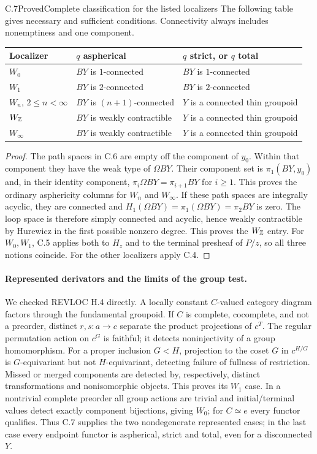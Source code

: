 \begin{claim}{C.7}{Proved}{Complete classification for the listed localizers}
\label{C:classification}
The following table gives necessary and sufficient conditions.
Connectivity always includes nonemptiness and one component.
\begin{center}
\begin{tabular}{lll}
\hline
Localizer & $q$ aspherical & $q$ strict, or $q$ total\\
\hline
$W_0$ & $BY$ is $1$-connected & $BY$ is $1$-connected\\
$W_1$ & $BY$ is $2$-connected & $BY$ is $2$-connected\\
$W_n$, $2\leq n<\infty$ & $BY$ is $(n+1)$-connected
  & $Y$ is a connected thin groupoid\\
$W_{\mathbb Z}$ & $BY$ is weakly contractible
  & $Y$ is a connected thin groupoid\\
$W_\infty$ & $BY$ is weakly contractible
  & $Y$ is a connected thin groupoid\\
\hline
\end{tabular}
\end{center}
\end{claim}
\begin{proof}
The path spaces in C.6 are empty off the component of $y_0$.
Within that component they have the weak type of $\Omega BY$.
Their component set is $\pi_1(BY,y_0)$ and, in their identity
component, $\pi_i\Omega BY=\pi_{i+1}BY$ for $i\geq1$.
This proves the ordinary asphericity columns for $W_n$ and
$W_\infty$. If these path spaces are integrally acyclic, they
are connected and $H_1(\Omega BY)=\pi_1(\Omega BY)=\pi_2BY$
is zero. The loop space is therefore simply connected and
acyclic, hence weakly contractible by Hurewicz in the first
possible nonzero degree. This proves the $W_{\mathbb Z}$ entry.
For $W_0,W_1$, C.5 applies both to $H_z$ and to the terminal
presheaf of $P/z$, so all three notions coincide. For the other
localizers apply C.4.
\end{proof}

\paragraph{Represented derivators and the limits of the group test.}
We checked REVLOC H.4 directly. A locally constant $C$-valued
category diagram factors through the fundamental groupoid.
If $C$ is complete, cocomplete, and not a preorder, distinct
$r,s:a\to c$ separate the product projections of $c^T$.
The regular permutation action on $c^G$ is faithful; it detects
noninjectivity of a group homomorphism. For a proper inclusion
$G<H$, projection to the coset $G$ in $c^{H/G}$ is $G$-equivariant
but not $H$-equivariant, detecting failure of fullness of
restriction. Missed or merged components are detected by,
respectively, distinct transformations and nonisomorphic objects.
This proves its $W_1$ case. In a nontrivial complete preorder all
group actions are trivial and initial/terminal values detect
exactly component bijections, giving $W_0$; for $C\simeq e$
every functor qualifies. Thus C.7 supplies the two nondegenerate
represented cases; in the last case every endpoint functor is
aspherical, strict and total, even for a disconnected $Y$.

